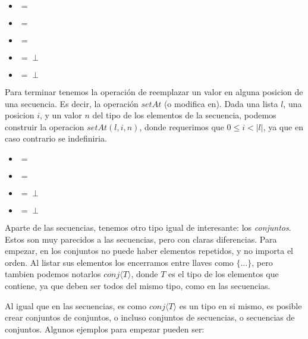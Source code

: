 \documentclass{article}
\begin{document}
\begin{center}
	\begin{itemize}
	
		\item[]  $=$ 
		\item[]  $=$ 
		\item[]  $=$ \lista{}
		\item[]  $= \perp$
		\item[]  $= \perp$
	
	\end{itemize}
\end{center}

Para terminar tenemos la operación de reemplazar un valor en alguna posicion de una secuencia. Es decir, la operación $setAt$ (o modifica en). Dada una lista $l$, una posicion $i$, y un valor $n$ del tipo de los elementos de la secuencia, podemos construir la operacion $setAt(l, i, n)$, donde requerimos que $0 \leq i < |l|$, ya que en caso contrario se indefiniria.

\begin{center}
	\begin{itemize}
	
		\item[]  $=$ 
		\item[]  $=$ 
		\item[]  $= \perp$
		\item[]  $= \perp$
	
	\end{itemize}
\end{center}

Aparte de las secuencias, tenemos otro tipo igual de interesante: los \textit{conjuntos}. Estos son muy parecidos a las secuencias, pero con claras diferencias. Para empezar, en los conjuntos no puede haber elementos repetidos, y no importa el orden. Al listar sus elementos los encerramos entre llaves como $\{ \ldots \}$, pero tambien podemos notarlos $conj \langle T \rangle$, donde $T$ es el tipo de los elementos que contiene, ya que deben ser todos del mismo tipo, como en las secuencias.

Al igual que en las secuencias, es como $conj \langle T \rangle$ es un tipo en si mismo, es posible crear conjuntos de conjuntos, o incluso conjuntos de secuencias, o secuencias de conjuntos. Algunos ejemplos para empezar pueden ser:
\end{document}
